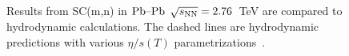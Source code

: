 \documentclass[ALICE,manyauthors]{cernphprep}
\begin{document}
\begin{figure}[htbp]
            \begin{center}
              \end{center}
        \caption{Results from SC(m,n) in $\textnormal{Pb--Pb}$ $\sqrt{s_{\textnormal{NN}}}=2.76$~TeV are compared to hydrodynamic calculations. The dashed lines are hydrodynamic predictions with various $\eta/s(T)$ parametrizations~\cite{Niemi:2015qia}.}
        \label{fig:Figure_3}
\end{figure}
\end{document}
